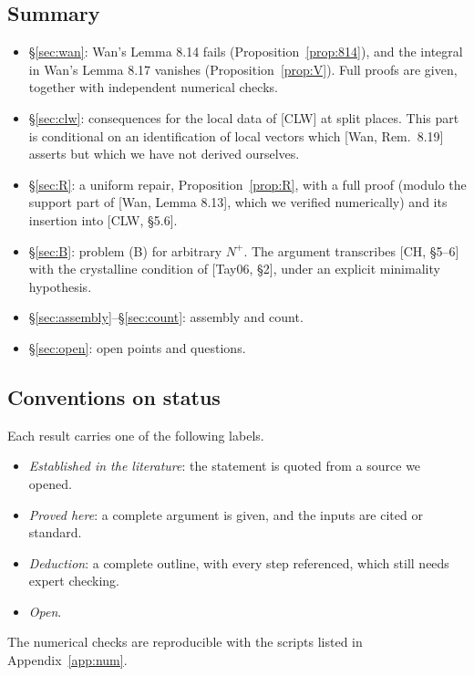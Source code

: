 \documentclass[11pt]{amsart}
\theoremstyle{definition}
\theoremstyle{remark}
\begin{document}
\subsection{Summary}
\begin{itemize}
\item \S\ref{sec:wan}: Wan's Lemma 8.14 fails (Proposition~\ref{prop:814}), and the integral in Wan's Lemma 8.17 vanishes (Proposition~\ref{prop:V}). Full proofs are given, together with independent numerical checks.
\item \S\ref{sec:clw}: consequences for the local data of [CLW] at split places. This part is conditional on an identification of local vectors which [Wan, Rem.~8.19] asserts but which we have not derived ourselves.
\item \S\ref{sec:R}: a uniform repair, Proposition~\ref{prop:R}, with a full proof (modulo the support part of [Wan, Lemma 8.13], which we verified numerically) and its insertion into [CLW, \S 5.6].
\item \S\ref{sec:B}: problem (B) for arbitrary $N^+$. The argument transcribes [CH, \S 5--6] with the crystalline condition of [Tay06, \S 2], under an explicit minimality hypothesis.
\item \S\ref{sec:assembly}--\S\ref{sec:count}: assembly and count.
\item \S\ref{sec:open}: open points and questions.
\end{itemize}

\subsection{Conventions on status}
Each result carries one of the following labels.
\begin{itemize}
\item \emph{Established in the literature}: the statement is quoted from a source we opened.
\item \emph{Proved here}: a complete argument is given, and the inputs are cited or standard.
\item \emph{Deduction}: a complete outline, with every step referenced, which still needs expert checking.
\item \emph{Open}.
\end{itemize}
The numerical checks are reproducible with the scripts listed in Appendix~\ref{app:num}.

\end{document}
